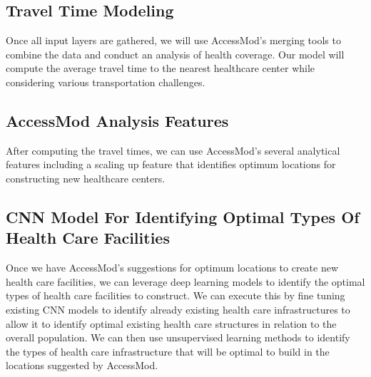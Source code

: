 \documentclass[11pt]{article}
\begin{document}
\subsection{Travel Time Modeling}
Once all input layers are gathered, we will use AccessMod’s merging tools to combine the data and conduct an analysis of health coverage. Our model will compute the average travel time to the nearest healthcare center while considering various transportation challenges.

\subsection{AccessMod Analysis Features}
After computing the travel times, we can use AccessMod's several analytical features including a scaling up feature that identifies optimum locations for constructing new healthcare centers.

\subsection{CNN Model For Identifying Optimal Types Of Health Care Facilities}
Once we have AccessMod's suggestions for optimum locations to create new health care facilities, we can leverage deep learning models to identify the optimal types of health care facilities to construct. We can execute this by fine tuning existing CNN models to identify already existing health care infrastructures to allow it to identify optimal existing health care structures in relation to the overall population. We can then use unsupervised learning methods to identify the types of health care infrastructure that will be optimal to build in the locations suggested by AccessMod. 
\end{document}
